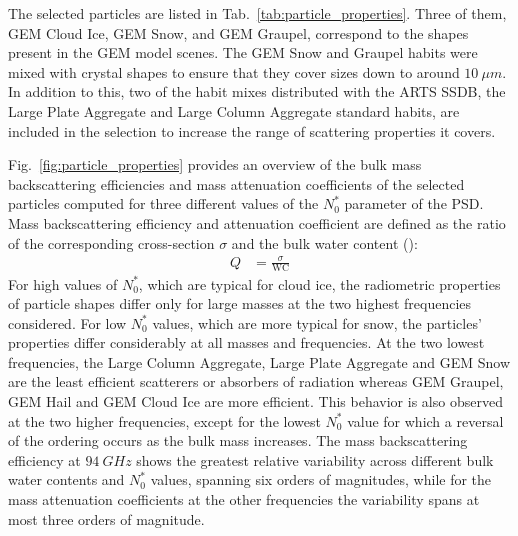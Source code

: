 \documentclass[journal abbreviation, manuscript]{copernicus}
\begin{document}
The selected particles are listed in Tab.~\ref{tab:particle_properties}. Three
of them, GEM Cloud Ice, GEM Snow, and GEM Graupel, correspond to the shapes
present in the GEM model scenes. The GEM Snow and Graupel habits were mixed with
crystal shapes to ensure that they cover sizes down to around $10\ \unit{\mu
  m}$. In addition to this, two of the habit mixes distributed with the ARTS
SSDB, the Large Plate Aggregate and Large Column Aggregate standard habits, are
included in the selection to increase the range of scattering properties it
covers.

Fig.~\ref{fig:particle_properties} provides an overview of the bulk mass
backscattering efficiencies and mass attenuation coefficients of the selected
particles computed for three different values of the $N_0^*$ parameter of the
PSD. Mass backscattering efficiency and attenuation coefficient are defined as
the ratio of the corresponding cross-section $\sigma$ and the bulk water
content ():
\begin{align}
  Q &= \frac{\sigma}{\text{WC}}
\end{align}
For high values of $N_0^*$, which are typical for cloud ice, the radiometric
properties of particle shapes differ only for large masses at the two highest
frequencies considered. For low $N_0^*$ values, which are more typical for snow,
the particles' properties differ considerably at all masses and frequencies. At
the two lowest frequencies, the Large Column Aggregate, Large Plate Aggregate
and GEM Snow are the least efficient scatterers or absorbers of radiation
whereas GEM Graupel, GEM Hail and GEM Cloud Ice are more efficient. This
behavior is also observed at the two higher frequencies, except for the lowest
$N_0^*$ value for which a reversal of the ordering occurs as the bulk mass
increases. The mass backscattering efficiency at $94\ \unit{GHz}$ shows the
greatest relative variability across different bulk water contents and $N_0^*$
values, spanning six orders of magnitudes, while for the mass attenuation
coefficients at the other frequencies the variability spans at most three orders
of magnitude.
\end{document}
